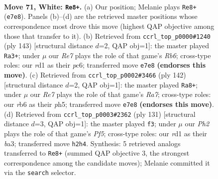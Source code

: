 \documentclass[11pt]{article}
\begin{document}
\clearpage

\begin{figure}[p]\centering
\begin{subfigure}{0.46\textwidth}\centering
\resizebox{\linewidth}{!}{%
\newchessgame
\chessboard[
  setfen={7k/4R3/1r6/8/5K2/8/7P/3r4 w - - 9 71},
  showmover=false,
  pgfstyle=straightmove, color=movearrow, markmove={e7-e8}
]}
\caption{}
\end{subfigure}\hfill
\begin{subfigure}{0.46\textwidth}\centering
\resizebox{\linewidth}{!}{%
\newchessgame
\chessboard[
  setfen={8/K7/2P2k2/8/5p2/1r6/7R/8 b - - 1 72},
  showmover=false,
  pgfstyle=straightmove, color=movearrow, markmove={b3-a3}
]}
\caption{}
\end{subfigure}
\\[4pt]
\begin{subfigure}{0.46\textwidth}\centering
\resizebox{\linewidth}{!}{%
\newchessgame
\chessboard[
  setfen={4k3/R7/8/6Pp/8/1r6/8/4K3 w - - 11 72},
  showmover=false,
  pgfstyle=straightmove, color=movearrow, markmove={a7-a8}
]}
\caption{}
\end{subfigure}\hfill
\begin{subfigure}{0.46\textwidth}\centering
\resizebox{\linewidth}{!}{%
\newchessgame
\chessboard[
  setfen={8/8/6k1/1r6/5p2/B7/7R/K7 b - - 14 66},
  showmover=false,
  pgfstyle=straightmove, color=movearrow, markmove={f4-f3}
]}
\caption{}
\end{subfigure}
\caption{\textbf{Move 71, White: \texttt{Re8+}.} (a) Our position; Melanie plays \texttt{Re8+} (\texttt{e7e8}). Panels (b)--(d) are the retrieved master positions whose correspondence most drove this move (highest QAP objective among those that transfer to it). (b) Retrieved from \texttt{ccrl\_top\_p0000\#1240} (ply 143) [structural distance $d$=2, QAP obj=1]: the master played \texttt{Ra3+}; under $\mu$ our \emph{Re7} plays the role of that game's \emph{Rb6}; cross-type roles: our \emph{r}d1 as their \emph{p}c6; transferred move \texttt{e7e8} \textbf{(endorses this move)}. (c) Retrieved from \texttt{ccrl\_top\_p0002\#3466} (ply 142) [structural distance $d$=2, QAP obj=1]: the master played \texttt{Ra8+}; under $\mu$ our \emph{Re7} plays the role of that game's \emph{Ra7}; cross-type roles: our \emph{r}b6 as their \emph{p}h5; transferred move \texttt{e7e8} \textbf{(endorses this move)}. (d) Retrieved from \texttt{ccrl\_top\_p0003\#2362} (ply 131) [structural distance $d$=3, QAP obj=1]: the master played \texttt{f3}; under $\mu$ our \emph{Ph2} plays the role of that game's \emph{Pf5}; cross-type roles: our \emph{r}d1 as their \emph{b}a3; transferred move \texttt{h2h4}. Synthesis: 5 retrieved analogs transferred to \texttt{Re8+} (summed QAP objective 3, the strongest correspondence among the candidate moves); Melanie committed it via the \texttt{search} selector.}
\label{fig:thought-m140}
\end{figure}
\end{document}

